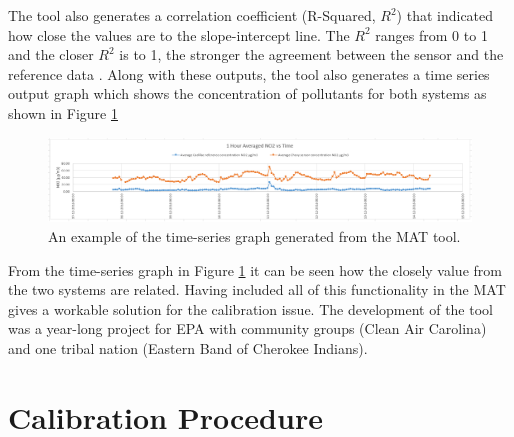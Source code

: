 The tool also generates a correlation coefficient (R-Squared, $R^2 $) that indicated how close the values are to the slope-intercept line. The $R^2 $ ranges from 0 to 1 and the closer $R^2$ is to 1, the stronger the agreement between the sensor and the reference data \cite{Williams2018}. Along with these outputs, the tool also generates a time series output graph which shows the concentration of pollutants for both systems as shown in Figure \ref{time}

\begin{figure}[h]
    \begin{center}
    \includegraphics[scale=0.55]{./images/figure8.png}
    \end{center}
    \caption{An example of the time-series graph generated from the MAT tool.}
    \label{time}
  \end{figure}

From the time-series graph in Figure \ref{time} it can be seen how the closely value from the two systems are related.
Having included all of this functionality in the MAT gives a workable solution for the calibration issue. The development of the tool was a year-long project for EPA with community groups (Clean Air
Carolina) and  one tribal nation (Eastern Band of Cherokee Indians).






\section{Calibration Procedure}


